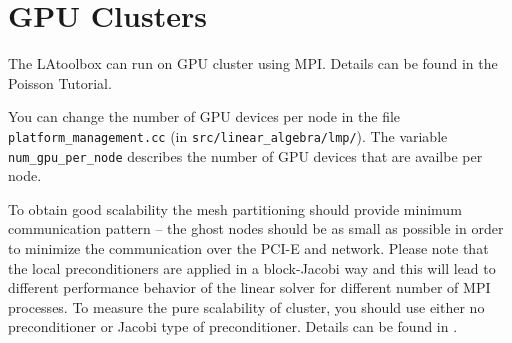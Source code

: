 \documentclass[a4paper, 11pt, twoside]{article}
\begin{document}
\section{GPU Clusters}

The LAtoolbox can run on GPU cluster using MPI. Details can be found in the
Poisson Tutorial.

You can change the number of GPU devices per node in the file
\verb'platform_management.cc' (in \verb'src/linear_algebra/lmp/'). The
variable \verb'num_gpu_per_node' describes the number of GPU devices that 
are availbe per node.

To obtain good scalability the mesh partitioning should provide minimum
communication pattern -- the ghost nodes should be as small as possible in
order to minimize the communication over the PCI-E and network. Please note
that the local preconditioners are applied in a block-Jacobi way and this
will lead to different performance behavior of the linear solver for different
number of MPI processes. To measure the pure scalability of cluster, you should
use either no preconditioner or Jacobi type of preconditioner. Details can be 
found in \cite{HSLW2010,Lukarski2012}.


\newpage




\printindex
\end{document}
